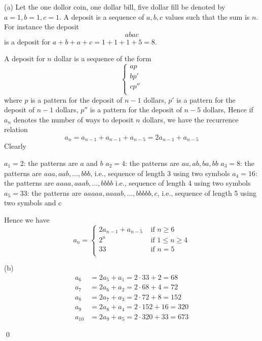 
(a)
Let the one dollor coin, one dollar bill, five dollar fill be denoted by
$a=1, b=1, c=1$.
A deposit is a sequence of $a,b,c$ values such that the sum is $n$.
For instance the deposit
\[
a b a c
\]
is a deposit for $a + b + a + c = 1 + 1 + 1 + 5 = 8$.

A deposit for $n$ dollar is a sequence of the form
\[
\begin{cases}
a p \\
b p' \\
c p'' \\
\end{cases}
\]
where
$p$ is a pattern for the deposit of $n - 1$ dollars,
$p'$ is a pattern for the deposit of $n - 1$ dollars,
$p''$ is a pattern for the deposit of $n - 5$ dollars,
Hence if $a_n$ denotes the number of ways to deposit $n$ dollars,
we have the recurrence relation
\[
a_n =  a_{n-1} + a_{n - 1} + a_{n - 5} = 2 a_{n - 1} + a_{n - 5}
\]
Clearly
\begin{enumerate}[nosep]
\li $a_1 = 2$: the patterns are $a$ and $b$
\li $a_2 = 4$: the patterns are $aa, ab, ba, bb$
\li $a_3 = 8$: the patterns are $aaa, aab, ..., bbb$, i.e., sequence of length 3 using two symbols
\li $a_4 = 16$: the patterns are $aaaa, aaab, ..., bbbb$ i.e., sequence of length 4 using two symbols
\li $a_5 = 33$: the patterns are $aaaaa, aaaab, ..., bbbbb, c$, i.e., sequence of length 5 using two symbols and $c$
\end{enumerate}

Hence we have
\[
a_n =
\begin{cases}
2 a_{n-1} + a_{n - 5} & \text{ if } n \geq 6 \\
2^n                 & \text{ if } 1 \leq n \geq 4 \\
33                  & \text{ if } n = 5 \\

\end{cases}
\]

(b)
\begin{align*}
a_6 &= 2 a_5 + a_1 = 2 \cdot 33 + 2 = 68 \\
a_7 &= 2 a_6 + a_2 = 2 \cdot 68 + 4 = 72 \\
a_8 &= 2 a_7 + a_3 = 2 \cdot 72 + 8 = 152 \\
a_9 &= 2 a_8 + a_4 = 2 \cdot 152 + 16 = 320 \\
a_{10} &= 2 a_9 + a_5 = 2 \cdot 320 + 33 = 673
\end{align*}
\ANSWER {}

\qed
